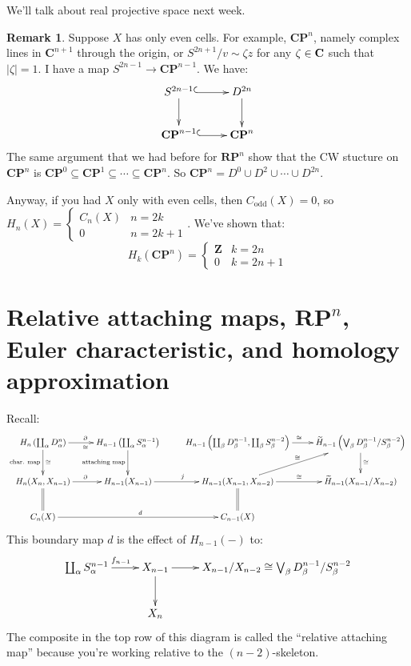 \documentclass{amsart}
\theoremstyle{theorem}
\theoremstyle{definition}
\newtheorem{remark}[theorem]{Remark}
\newcommand{\CP}{\mathbf{CP}}
\newcommand{\RP}{\mathbf{RP}}
\newcommand{\Z}{\mathbf Z}
\begin{document}
We'll talk about real projective space next week.
\begin{remark}
Suppose $X$ has only even cells. For example, $\mathbf{CP}^n$, namely complex lines in $\mathbf{C}^{n+1}$ through the origin, or $S^{2n+1}/v\sim \zeta z$ for any $\zeta\in \mathbf C$ such that $|\zeta|=1$. I have a map $S^{2n-1}\to \mathbf{CP}^{n-1}$. We have:
\begin{equation*}
\xymatrix{S^{2n-1}\ar@{^(->}[r]\ar[d] & D^{2n}\ar[d]\\
\mathbf{CP}^{n-1}\ar@{^(->}[r] & \mathbf{CP}^n}
\end{equation*}
The same argument that we had before for $\mathbf{RP}^n$ show that the CW stucture on $\mathbf{CP}^n$ is $\CP^0\subseteq\CP^1\subseteq\cdots\subseteq\CP^n$. So $\CP^n=D^0\cup D^2\cup\cdots\cup D^{2n}$.

Anyway, if you had $X$ only with even cells, then $C_{\text{odd}}(X)=0$, so $ H_n(X)=\begin{cases}C_n(X) & n=2k \\ 0 & n=2k+1\end{cases}$. We've shown that:
\begin{equation*}
 H_k(\mathbf{CP}^n)=\begin{cases}
\Z & k=2n\\
0 & k=2n+1
\end{cases}
\end{equation*}
\end{remark}
\section{Relative attaching maps, $\RP^n$, Euler characteristic, and homology approximation}
Recall:
\begin{equation*}
\xymatrix{ H_n\left(\coprod_\alpha D^n_\alpha\right)\ar[r]^\partial_\cong\ar[d]^\cong_{\text{char. map}} & H_{n-1}\left(\coprod_\alpha S^{n-1}_\alpha\right)\ar[d]_{\text{attaching map}} & H_{n-1}\left(\coprod_\beta D^{n-1}_\beta,\coprod_\beta S^{n-2}_\beta\right) \ar[r]^\cong & \widetilde{ H}_{n-1}\left(\bigvee_\beta D^{n-1}_\beta/S^{n-2}_\beta\right)\ar[d]^\cong\\
 H_n(X_n,X_{n-1})\ar[r]^\partial\ar@{=}[d] & H_{n-1}(X_{n-1})\ar[r]^j & H_{n-1}(X_{n-1},X_{n-2})\ar[r]^\cong\ar[ur]^\cong\ar@{=}[d] & \widetilde{ H}_{n-1}(X_{n-1}/X_{n-2})\\
C_n(X)\ar[rr]^d & & C_{n-1}(X)}
\end{equation*}
This boundary map $d$ is the effect of $ H_{n-1}(-)$ to:
\begin{equation*}
\xymatrix{\coprod_\alpha S^{n-1}_\alpha\ar[r]^{f_{n-1}} & X_{n-1}\ar[d]\ar[r] & X_{n-1}/X_{n-2}\cong \bigvee_\beta D^{n-1}_\beta/S^{n-2}_\beta\\
 & X_n}
\end{equation*}
The composite in the top row of this diagram is called the ``relative attaching map'' because you're working relative to the $(n-2)$-skeleton.
\end{document}
